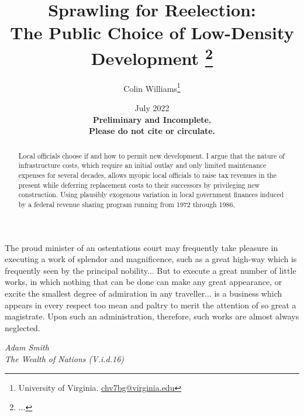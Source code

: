 \documentclass[12pt]{article}
\title{ \vspace*{-2.5cm} \hspace*{-0.5cm}Sprawling for Reelection: \\ The Public Choice of Low-Density Development \footnote{
...
}}
\author{Colin Williams\thanks{University of Virginia.
\href{mailto:chv7bg@virginia.edu}{chv7bg@virginia.edu}} }%
\date{ \vspace*{0.5cm} July 2022 \\
\textbf{Preliminary and Incomplete. \\ Please do not cite or circulate.}
}
\begin{document}
\bgroup
\let\footnoterule\relax

\begin{singlespace}
\maketitle


\begin{abstract}
    \noindent Local officials choose if and how to permit new development. I argue that the nature of infrastructure costs, which require an initial outlay and only limited maintenance expenses for several decades, allows myopic local officials to raise tax revenues in the present while deferring replacement costs to their successors by privileging new construction. Using plausibly exogenous variation in local government finances induced by a federal revenue sharing program running from 1972 through 1986,  
\end{abstract}
\end{singlespace}
\thispagestyle{empty}

\clearpage
\egroup
\setcounter{page}{1}



\noindent %


\epigraph{The proud minister of an ostentatious court may frequently take pleasure in executing a work of splendor and magnificence, such as a great high-way which is frequently seen by the principal nobility... But to execute a great number of little works, in which nothing that can be done can make any great appearance, or excite the smallest degree of admiration in any traveller... is a business which appears in every respect too mean and paltry to merit the attention of so great a magistrate. Upon such an administration, therefore, such works are almost always neglected.}{\textit{Adam Smith \\ The Wealth of Nations (V.i.d.16)}}
\end{document}
